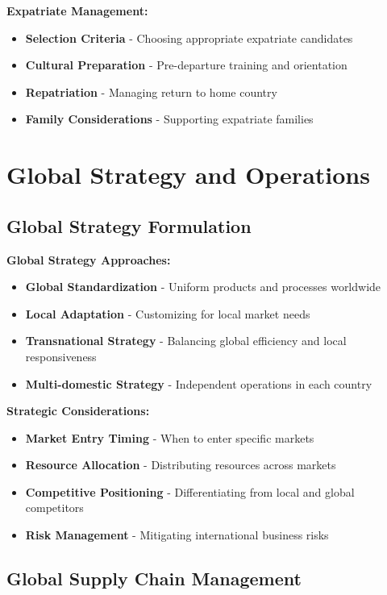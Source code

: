 \documentclass[12pt]{article}
\begin{document}
\textbf{Expatriate Management:}
\begin{itemize}
    \item \textbf{Selection Criteria} - Choosing appropriate expatriate candidates
    \item \textbf{Cultural Preparation} - Pre-departure training and orientation
    \item \textbf{Repatriation} - Managing return to home country
    \item \textbf{Family Considerations} - Supporting expatriate families
\end{itemize}

\section{Global Strategy and Operations}

\subsection{Global Strategy Formulation}

\textbf{Global Strategy Approaches:}
\begin{itemize}
    \item \textbf{Global Standardization} - Uniform products and processes worldwide
    \item \textbf{Local Adaptation} - Customizing for local market needs
    \item \textbf{Transnational Strategy} - Balancing global efficiency and local responsiveness
    \item \textbf{Multi-domestic Strategy} - Independent operations in each country
\end{itemize}

\textbf{Strategic Considerations:}
\begin{itemize}
    \item \textbf{Market Entry Timing} - When to enter specific markets
    \item \textbf{Resource Allocation} - Distributing resources across markets
    \item \textbf{Competitive Positioning} - Differentiating from local and global competitors
    \item \textbf{Risk Management} - Mitigating international business risks
\end{itemize}

\subsection{Global Supply Chain Management}
\end{document}
